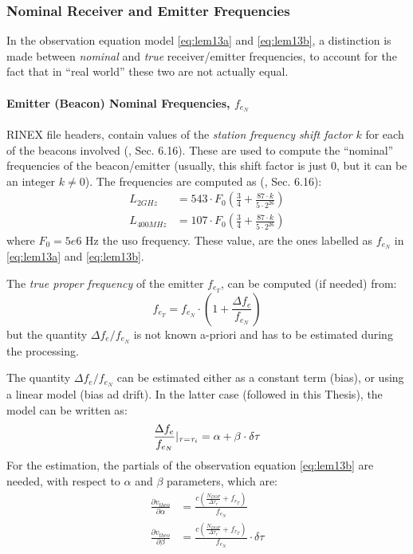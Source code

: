 \subsubsection{Nominal Receiver and Emitter Frequencies}\label{ssec:nominal-frequencies}
In the observation equation model \autoref{eq:lem13a} and \autoref{eq:lem13b}, a distinction is made between 
\emph{nominal} and \emph{true} receiver/emitter frequencies, to account for the 
fact that in ``real world'' these two are not actually equal.

\paragraph{Emitter (Beacon) Nominal Frequencies, $f_{e_N}$}\label{par:beacon-nominal-frequencies}
RINEX file headers, contain values of the \emph{station frequency shift 
factor} $k$ for each of the beacons involved (\cite{DORISRNX3}, Sec. 6.16). 
These are used to compute the ``nominal'' frequencies of the beacon/emitter 
(usually, this shift factor is just $0$, but it can be an integer 
$k \neq 0$). The frequencies are computed as (\cite{DORISRNX3}, Sec. 6.16):
\begin{equation}
  \begin{aligned}
    L_{2GHz}   &= 543 \cdot F_0 \left( \frac{3}{4} + \frac{87\cdot k}{5 \cdot 2^{26}} \right) \\
    L_{400MHz} &= 107 \cdot F_0 \left( \frac{3}{4} + \frac{87\cdot k}{5 \cdot 2^{26}} \right) 
    \label{eq:nominal-freq}
  \end{aligned}
\end{equation}
where $F_0 = 5e6 \text{ Hz}$ the \gls{uso} frequency. These value, are the ones 
labelled as $f_{e_N}$ in \autoref{eq:lem13a} and \autoref{eq:lem13b}.

The \emph{true proper frequency} of the emitter $f_{e_T}$, can be computed (if needed) 
from:
\begin{equation}
  f_{e_T} = f_{e_N} \cdot \left( 1 + \frac{\Delta f_e}{f_{e_N}} \right)
\end{equation}
but the quantity $\Delta f_e / f_{e_N}$ is not known a-priori and has to be 
estimated during the processing.

The quantity $\Delta f_e / f_{e_N}$  can be estimated either as a constant term (bias), 
or using a linear model (bias ad drift). In the latter case (followed in this Thesis), 
the model can be written as:
\begin{equation}
  \frac{\Delta f_e}{f_{e_N}}|_{\tau=\tau _i} = \alpha + \beta \cdot \delta \tau
\end{equation}
For the estimation, the partials of the observation equation \autoref{eq:lem13b} are needed, 
with respect to $\alpha$ and $\beta$ parameters, which are:
\begin{equation}
  \begin{aligned}
  \frac{\partial v_{theo}}{\partial \alpha} &= 
    \frac{c(\frac{N_{DOP}}{\Delta\tau_r} + f_{r_T})}{f_{e_N}} \\
  \frac{\partial v_{theo}}{\partial \beta} &= 
    \frac{c(\frac{N_{DOP}}{\Delta\tau_r} + f_{r_T})}{f_{e_N}} \cdot \delta \tau
  \end{aligned}
\end{equation}

